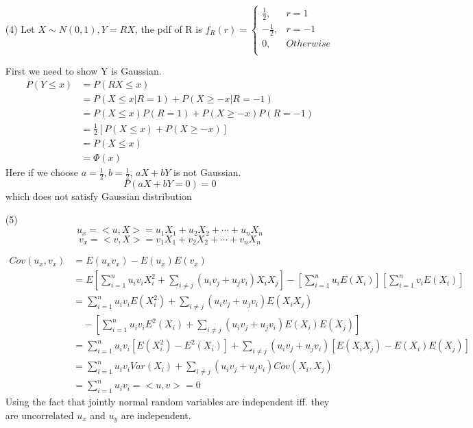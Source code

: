 \documentclass[a4paper,12pt]{article}
\begin{document}
\begin{enumerate}
\begin{itemize}
\clearpage
\item[(4)]
Let $X \sim N(0,1), Y = RX$, the pdf of R is $f_R(r) = 
\begin{cases}
\frac{1}{2} ,& r=1\\
-\frac{1}{2} ,& r=-1\\
0,& Otherwise\\
\end{cases}
$

First we need to show Y is Gaussian.
\begin{align*}
P (Y \le x)
&= P(RX \le x)\\
&=P(X \le x | R=1) + P(X \ge -x | R=-1)\\
&=P(X \le x) P(R=1) + P(X \ge -x ) P(R=-1)\\
&=\frac{1}{2} \left [ P(X \le x) + P(X \ge -x)\right ] \\
&= P (X \le x) \\
&=\Phi (x)
\end{align*}
Here if we choose $a = \frac{1}{2}, b = \frac{1}{2}$, $aX + bY$ is not Gaussian.
$$
P (aX + bY = 0) = 0
$$
which does not satisfy Gaussian distribution

\clearpage
\item[(5)]
$$
u_x = <u,X > = u_1 X_1 + u_2 X_2 + \cdots + u_n X_n
$$
$$
v_x = <v,X > = v_1 X_1 + v_2 X_2 + \cdots + v_n X_n
$$

\begin{align*}
Cov(u_x,v_x) 
&= E (u_x v_x) - E(u_x) E(v_x) \\
&= E \left [ \sum_{i=1}^n u_i v_i X_i^2 + \sum_{i \ne j} (u_i v_j + u_j v_i) X_i X_j \right ] - \left [ \sum_{i=1}^n u_i E(X_i) \right ] \left [ \sum_{i=1}^n v_i E(X_i) \right ] \\
&= \sum_{i=1}^n u_i v_i E(X_i^2) + \sum_{i \ne j} (u_i v_j + u_j v_i) E ( X_i X_j) \\
&\quad - \left [ \sum_{i=1}^n u_i v_i E^2(X_i) +  \sum_{i \ne j} (u_i v_j + u_j v_i) E ( X_i) E(X_j)\right] \\
&= \sum_{i=1}^n u_i v_i [ E(X_i^2) - E^2(X_i) ] +  \sum_{i \ne j} (u_i v_j + u_j v_i) [E ( X_i X_j) - E ( X_i) E(X_j)] \\
&= \sum_{i=1}^n u_i v_i Var(X_i) +  \sum_{i \ne j} (u_i v_j + u_j v_i) Cov(X_i, X_j) \\
&= \sum_{i=1}^n u_i v_i = <u,v> = 0
\end{align*}
Using the fact that jointly normal random variables are independent iff. they are uncorrelated $u_x$ and $u_y$ are independent.


\end{itemize}
\end{enumerate}
\end{document}
